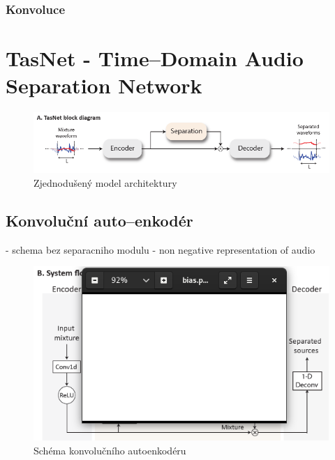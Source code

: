 \subsection{Konvoluce}




\chapter{TasNet - Time--Domain Audio Separation Network}
\label{tasnet}
\begin{figure}[H]
    \centering
    \includegraphics[scale=0.5]{obrazky-figures/tasnet-pipe.png}
    \caption{\label{fig:tasnet-pipe}Zjednodušený model architektury}
\end{figure}

\section{Konvoluční auto--enkodér}

- schema bez separacniho modulu
- non negative representation of audio
\begin{figure}[H]
    \centering
    \includegraphics[scale=0.5]{obrazky-figures/tasnet-autoencoder.png}
    \caption{\label{fig:tasnet-autoencoder}Schéma konvolučního autoenkodéru}
\end{figure}

